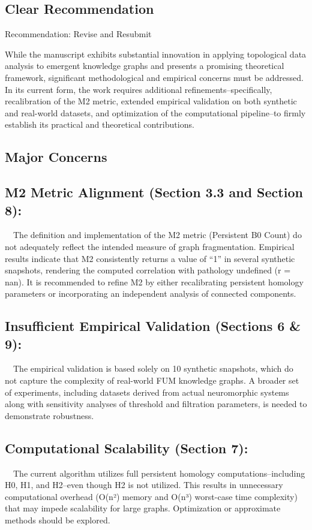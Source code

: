 \documentclass{article}
\begin{document}
\hrulefill
\subsection{Clear Recommendation}

Recommendation: Revise and Resubmit

While the manuscript exhibits substantial innovation in applying topological data analysis to emergent knowledge graphs and presents a promising theoretical framework, significant methodological and empirical concerns must be addressed. In its current form, the work requires additional refinements--specifically, recalibration of the M2 metric, extended empirical validation on both synthetic and real-world datasets, and optimization of the computational pipeline--to firmly establish its practical and theoretical contributions.

\hrulefill
\subsection{Major Concerns}

\subsection{M2 Metric Alignment (Section 3.3 and Section 8):  }
 The definition and implementation of the M2 metric (Persistent B0 Count) do not adequately reflect the intended measure of graph fragmentation. Empirical results indicate that M2 consistently returns a value of “1” in several synthetic snapshots, rendering the computed correlation with pathology undefined (r = nan). It is recommended to refine M2 by either recalibrating persistent homology parameters or incorporating an independent analysis of connected components.

\subsection{Insufficient Empirical Validation (Sections 6 \& 9):  }
 The empirical validation is based solely on 10 synthetic snapshots, which do not capture the complexity of real-world FUM knowledge graphs. A broader set of experiments, including datasets derived from actual neuromorphic systems along with sensitivity analyses of threshold and filtration parameters, is needed to demonstrate robustness.

\subsection{Computational Scalability (Section 7):  }
 The current algorithm utilizes full persistent homology computations--including H0, H1, and H2--even though H2 is not utilized. This results in unnecessary computational overhead (O(n²) memory and O(n³) worst-case time complexity) that may impede scalability for large graphs. Optimization or approximate methods should be explored.
\end{document}
